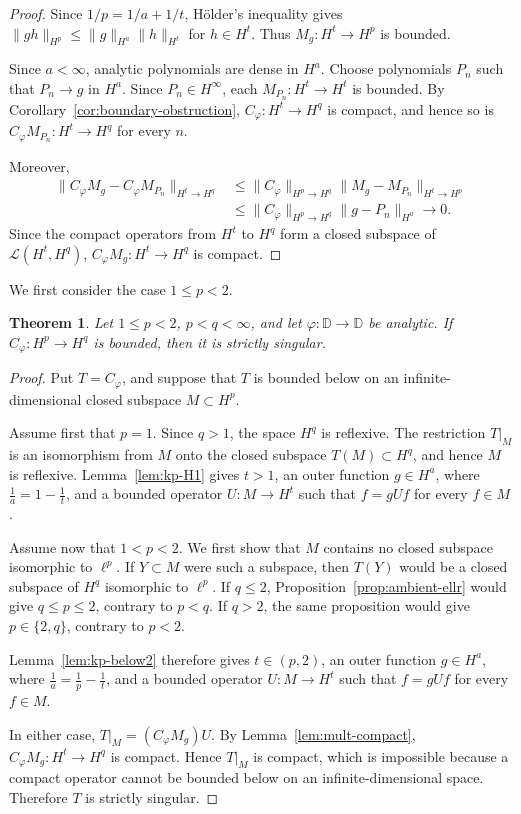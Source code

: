 \documentclass[11pt, reqno]{amsart}
\newtheorem{theorem}{Theorem}[section]
\theoremstyle{definition}
\theoremstyle{remark}
\newcommand{\D}{\mathbb{D}}
\begin{document}
\begin{proof}
Since \(1/p=1/a+1/t\), H\"older's inequality gives
\(\|gh\|_{H^p}\le\|g\|_{H^a}\|h\|_{H^t}\) for \(h\in H^t\).
Thus \(M_g:H^t\to H^p\) is bounded.


Since \(a<\infty\), analytic polynomials are dense in \(H^a\).
Choose polynomials \(P_n\) such that \(P_n\to g\) in \(H^a\).
Since \(P_n\in H^\infty\), each
\(M_{P_n}:H^t\to H^t\) is bounded. By
Corollary~\ref{cor:boundary-obstruction},
\(C_\varphi:H^t\to H^q\) is compact, and hence so is
\(C_\varphi M_{P_n}:H^t\to H^q\) for every \(n\).

Moreover,
\[
\begin{aligned}
\|C_\varphi M_g-C_\varphi M_{P_n}\|_{H^t\to H^q}
&\le
\|C_\varphi\|_{H^p\to H^q}
\|M_g-M_{P_n}\|_{H^t\to H^p}\\
&\le
\|C_\varphi\|_{H^p\to H^q}
\|g-P_n\|_{H^a}
\longrightarrow0.
\end{aligned}
\]
Since the compact operators from \(H^t\) to \(H^q\) form a
closed subspace of \(\mathcal L(H^t,H^q)\),
\(C_\varphi M_g:H^t\to H^q\) is compact.
\end{proof}

We first consider the case \(1\le p<2\).

\begin{theorem}
\label{thm:ss-below2}
Let \(1\le p<2\), \(p<q<\infty\), and let
\(\varphi:\D\to\D\) be analytic. If
\(C_\varphi:H^p\to H^q\) is bounded, then it is strictly singular.
\end{theorem}

\begin{proof}
Put \(T=C_\varphi\), and suppose that \(T\) is bounded below on an
infinite-dimensional closed subspace \(M\subset H^p\).

Assume first that \(p=1\). Since \(q>1\), the space \(H^q\) is
reflexive. The restriction \(T|_M\) is an isomorphism from \(M\) onto
the closed subspace \(T(M)\subset H^q\), and hence \(M\) is reflexive.
Lemma~\ref{lem:kp-H1} gives \(t>1\), an outer
function \(g\in H^a\), where \(\frac1 a=1-\frac 1 t\), and a bounded operator
\(U:M\to H^t\) such that \(f=gUf\) for every \(f\in M\).

Assume now that \(1<p<2\). We first show that \(M\) contains no closed
subspace isomorphic to \(\ell^p\). If \(Y\subset M\) were such a
subspace, then \(T(Y)\) would be a closed subspace of \(H^q\)
isomorphic to \(\ell^p\). If \(q\le2\),
Proposition~\ref{prop:ambient-ellr} would give \(q\le p\le2\),
contrary to \(p<q\). If \(q>2\), the same proposition would give
\(p\in\{2,q\}\), contrary to \(p<2\).

Lemma~\ref{lem:kp-below2} therefore gives
\(t\in(p,2)\), an outer function \(g\in H^a\), where
\(\frac1 a=\frac1 p-\frac1 t\), and a bounded operator \(U:M\to H^t\) such that
\(f=gUf\) for every \(f\in M\).

In either case,
\(T|_M=(C_\varphi M_g)U.
\)
By Lemma~\ref{lem:mult-compact},
\(C_\varphi M_g:H^t\to H^q\) is compact. Hence \(T|_M\) is compact,
which is impossible because a compact operator cannot be bounded
below on an infinite-dimensional space. Therefore \(T\) is strictly
singular.
\end{proof}
\end{document}
